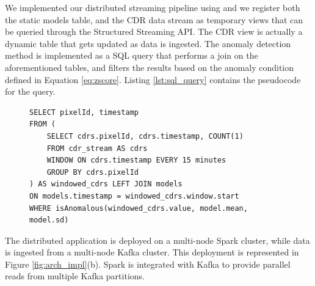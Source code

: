 {We implemented our distributed streaming pipeline using \sparkdi{} and we register both the static models table, and the CDR data stream as temporary views that can be queried through the Structured Streaming API. The CDR view is actually a dynamic table that gets updated as data is ingested. The anomaly detection method is implemented as a SQL query that performs a join on the aforementioned tables, and filters the results based on the anomaly condition defined in Equation \eqref{eq:zscore}. Listing \ref{lst:sql_query} contains the pseudocode for the query.

\begin{figure}[ht]
\begin{minipage}{0.95\linewidth}
\begin{lstlisting}[caption={Spark SQL anomaly detection query.},frame=single,captionpos=b,label=lst:sql_query,style=SPARKSQL]
SELECT pixelId, timestamp
FROM (
	SELECT cdrs.pixelId, cdrs.timestamp, COUNT(1)
	FROM cdr_stream AS cdrs
	WINDOW ON cdrs.timestamp EVERY 15 minutes
	GROUP BY cdrs.pixelId
) AS windowed_cdrs LEFT JOIN models 
ON models.timestamp = windowed_cdrs.window.start 
WHERE isAnomalous(windowed_cdrs.value, model.mean, model.sd)
\end{lstlisting}
\end{minipage}
\end{figure}

The distributed application is deployed on a multi-node Spark cluster, while data is ingested from a multi-node Kafka cluster. This deployment is represented in Figure \ref{fig:arch_impl}(b). Spark is integrated with Kafka to provide parallel reads from multiple Kafka partitions. 

}
